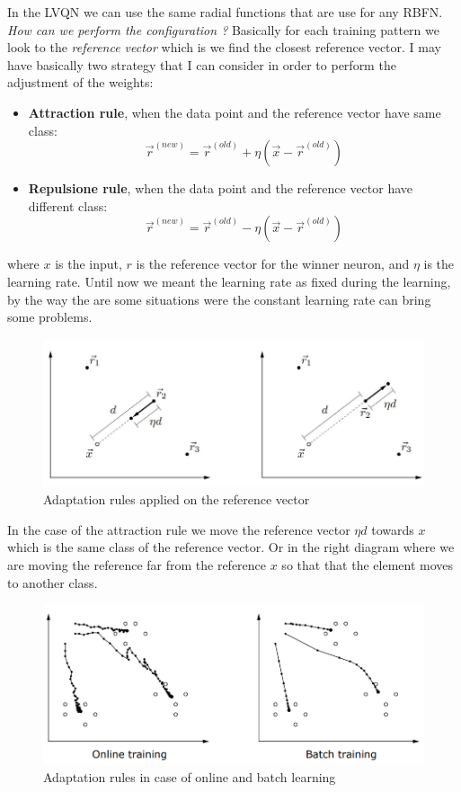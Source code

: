 \documentclass{article}
\begin{document}
In the LVQN we can use the same radial functions that are use for any RBFN.
\newline\newline
\textit{How can we perform the configuration ?}
Basically for each training pattern we look to the \textit{reference vector} which is
we find the closest reference vector.
\newline\newline
I may have basically two strategy that I can consider in order to perform the adjustment of the
weights:
\begin{itemize}
    \item \textbf{Attraction rule}, when the data point and the reference vector have same
          class:
          $$\vec{r}^{(new)}=\vec{r}^{(old)}+\eta(\vec{x}-\vec{r}^{(old)})$$
    \item \textbf{Repulsione rule}, when the data point and the reference vector have different
          class:
          $$\vec{r}^{(new)}=\vec{r}^{(old)}-\eta(\vec{x}-\vec{r}^{(old)})$$
\end{itemize}
where $x$ is the input, $r$ is the reference vector for the winner neuron, and $\eta$ is the learning
rate. Until now we meant the learning rate as fixed during the learning, by the way the are some
situations were the constant learning rate can bring some problems.
\begin{figure}[H]
    \centering
    \includegraphics[scale=0.4]{images/adapt_rulesa.png}
    \caption{Adaptation rules applied on the reference vector}
\end{figure}
In the case of the attraction rule we move the reference vector $\eta d$ towards $x$
which is the same class of the reference vector. Or in the right diagram where
we are moving the reference far from the reference $x$ so that that the element
moves to another class.
\begin{figure}[H]
    \centering
    \includegraphics[scale=0.5]{images/onlk_batch_adap.png}
    \caption{Adaptation rules in case of online and batch learning}
\end{figure}
\end{document}
